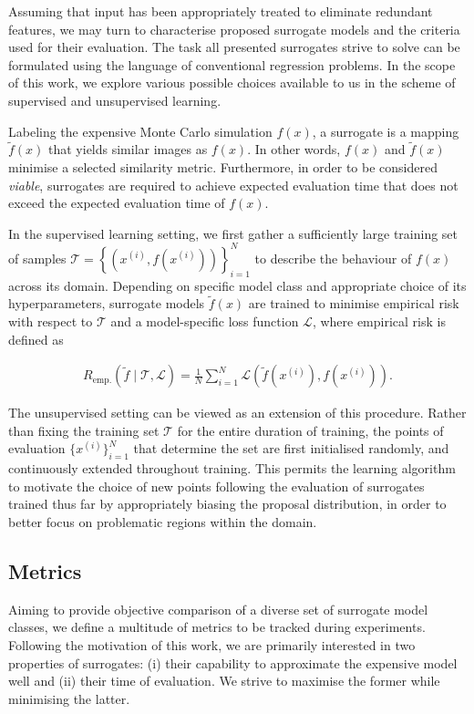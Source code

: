Assuming that input has been appropriately treated to eliminate redundant
features, we may turn to characterise proposed surrogate models and the criteria
used for their evaluation. The task all presented surrogates strive to solve can be
formulated using the language of conventional regression problems. In the scope
of this work, we explore various possible choices available to us in the
scheme of supervised and unsupervised learning.

Labeling the expensive Monte Carlo simulation $f(x)$, a surrogate is a mapping
$\tilde{f}(x)$ that yields similar images as $f(x)$. In other words, $f(x)$ and
$\tilde{f}(x)$ minimise a selected similarity metric. Furthermore, in order to
be considered \textit{viable}, surrogates are required to achieve expected evaluation time
that does not exceed the expected evaluation time of $f(x)$.

In the supervised learning setting, we first gather a sufficiently large
training set of samples $\mathcal{T}=\left\{\left( x^{(i)},f\left(x^{(i)}\right) \right)\right\}_{i=1}^N$
to describe the behaviour of $f(x)$ across its domain.
Depending on specific model class and appropriate choice of its
hyperparameters, surrogate models $\tilde{f}(x)$ are trained to minimise
empirical risk with respect to $\mathcal{T}$ and a model-specific
loss function $\mathcal{L}$, where empirical risk is defined as

\begin{align}
	R_{\text{emp.}}(\tilde{f}\mid\mathcal{T},\mathcal{L})
	=\frac{1}{N}\sum_{i=1}^N
	\mathcal{L}\left(\tilde{f}(x^{(i)}),f(x^{(i)})\right).
\end{align}

The unsupervised setting can be viewed as an extension of this procedure.
Rather than fixing the training set $\mathcal{T}$ for the entire duration of
training, the points of evaluation $\{x^{(i)}\}_{i=1}^N$ that determine the set
are first initialised randomly, and continuously extended throughout training. This
permits the learning algorithm to motivate the choice of new points following the
evaluation of surrogates trained thus far by appropriately biasing the
proposal distribution, in order to better focus on problematic regions within
the domain.


\subsection{Metrics}
\label{sec:metrics}

Aiming to provide objective comparison of a diverse set of surrogate model
classes, we define a multitude of metrics to be tracked during experiments.
Following the motivation of this work, we are primarily interested in two
properties of surrogates: (i) their capability to approximate the expensive
model well and (ii) their time of evaluation. We strive to maximise the former
while minimising the latter.

